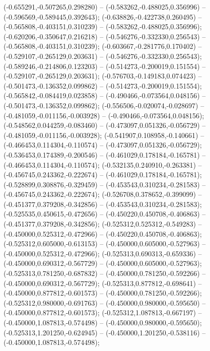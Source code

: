  (-0.655291,-0.507265,0.298280) -- (-0.583262,-0.488025,0.356996) -- (-0.596569,-0.589445,0.392643);
 (-0.638826,-0.422738,0.260495) -- (-0.565808,-0.403151,0.310239) -- (-0.583262,-0.488025,0.356996);
 (-0.620206,-0.350647,0.216218) -- (-0.546276,-0.332330,0.256543) -- (-0.565808,-0.403151,0.310239);
 (-0.603667,-0.281776,0.170402) -- (-0.529107,-0.265129,0.203631) -- (-0.546276,-0.332330,0.256543);
 (-0.589246,-0.214806,0.123203) -- (-0.514273,-0.200019,0.151554) -- (-0.529107,-0.265129,0.203631);
 (-0.576703,-0.149183,0.074423) -- (-0.501473,-0.136352,0.099862) -- (-0.514273,-0.200019,0.151554);
 (-0.565842,-0.084419,0.023858) -- (-0.490466,-0.073564,0.048156) -- (-0.501473,-0.136352,0.099862);
 (-0.556506,-0.020074,-0.028697) -- (-0.481059,-0.011156,-0.003928) -- (-0.490466,-0.073564,0.048156);
 (-0.548562,0.044259,-0.083460) -- (-0.473097,0.051326,-0.056729) -- (-0.481059,-0.011156,-0.003928);
 (-0.541907,0.108958,-0.140661) -- (-0.466453,0.114304,-0.110574) -- (-0.473097,0.051326,-0.056729);
 (-0.536453,0.174389,-0.200546) -- (-0.461029,0.178184,-0.165781) -- (-0.466453,0.114304,-0.110574);
 (-0.532135,0.240910,-0.263381) -- (-0.456745,0.243362,-0.222674) -- (-0.461029,0.178184,-0.165781);
 (-0.528899,0.308876,-0.329459) -- (-0.453543,0.310234,-0.281583) -- (-0.456745,0.243362,-0.222674);
 (-0.526708,0.378652,-0.399099) -- (-0.451377,0.379208,-0.342856) -- (-0.453543,0.310234,-0.281583);
 (-0.525535,0.450615,-0.472656) -- (-0.450220,0.450708,-0.406863) -- (-0.451377,0.379208,-0.342856);
 (-0.525312,0.525312,-0.549283) -- (-0.450000,0.525312,-0.472966) -- (-0.450220,0.450708,-0.406863);
 (-0.525312,0.605000,-0.613153) -- (-0.450000,0.605000,-0.527963) -- (-0.450000,0.525312,-0.472966);
 (-0.525313,0.690313,-0.659336) -- (-0.450000,0.690312,-0.567729) -- (-0.450000,0.605000,-0.527963);
 (-0.525313,0.781250,-0.687832) -- (-0.450000,0.781250,-0.592266) -- (-0.450000,0.690312,-0.567729);
 (-0.525313,0.877812,-0.698641) -- (-0.450000,0.877812,-0.601573) -- (-0.450000,0.781250,-0.592266);
 (-0.525312,0.980000,-0.691763) -- (-0.450000,0.980000,-0.595650) -- (-0.450000,0.877812,-0.601573);
 (-0.525312,1.087813,-0.667197) -- (-0.450000,1.087813,-0.574498) -- (-0.450000,0.980000,-0.595650);
 (-0.525313,1.201250,-0.624945) -- (-0.450000,1.201250,-0.538116) -- (-0.450000,1.087813,-0.574498);
